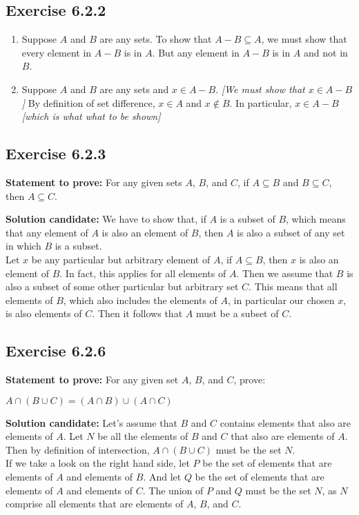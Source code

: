 \documentclass{report}
\newcommand{\cent}[1]{\begin{center}#1\end{center}}
\newcommand{\In}{\! \in \!}
\newcommand{\Prove}{\textbf{Statement to prove: }}
\newcommand{\solution}{\textbf{Solution candidate: }}
\newcommand{\QED}{\boxed{}}
\newcommand{\Exercise}[1]{\subsection{Exercise #1}}
\newcommand{\defaultEnumerateLabel}{\textbf{\alph*.}}
\begin{document}
	\Exercise{6.2.2}
	
	\begin{enumerate}[label=\defaultEnumerateLabel]
		\item Suppose $A$ and $B$ are any sets. To show that $A-B \subseteq A$, we must show that every element in $A-B$ is in $A$. But any element in $A-B$ is in $A$ and not in $B$.
		
		\item Suppose $A$ and $B$ are any sets and $x\In A-B$. \textit{[We must show that $x \In A-B$]} By definition of set difference, $x \In A$ and $x \notin B$. In particular, $x \In A - B$ \textit{[which is what what to be shown]}
	\end{enumerate}

	\Exercise{6.2.3}
	
	\Prove
	For any given sets $A$, $B$, and $C$, if $A \subseteq B$ and $B \subseteq C$, then $A \subseteq C$. 
	
	\solution
	We have to show that, if $A$ is a subset of  $B$, which means that any element of $A$ is also an element of $B$, then $A$ is also a subset of any set in which $B$ is a subset.\\
	
	Let $x$ be any particular but arbitrary element of $A$, if $A \subseteq B$, then $x$ is also an element of $B$.  In fact, this applies for all elements of $A$. Then we assume that $B$ is also a subset of some other particular but arbitrary set $C$. This means that all elements of $B$, which also includes the elements of $A$, in particular our chosen $x$, is also elements of $C$. Then it follows that $A$ must be a subset of $C$.\\
	\QED 
	
	\Exercise{6.2.6}
	
	\Prove
	For any given set $A$, $B$, and $C$, prove:
	
	\cent{$A \cap (B \cup C) = (A \cap B) \cup (A \cap C)$}
	
	\solution
	Let's assume that $B$ and $C$ contains elements that also are elements of $A$. Let $N$ be all the elements of $B$ and $C$ that also are elements of $A$. Then by definition of intersection, $A \cap (B \cup C)$  must be the set $N$.\\
	
	If we take a look on the right hand side, let $P$ be the set of elements that are elements of $A$ and elements of $B$. And let $Q$ be the set of elements that are elements of $A$ and elements of $C$. The union of $P$ and $Q$ must be the set $N$, as $N$ comprise all elements that are elements of $A$, $B$, and $C$.\\
	\QED
	
\end{document}
